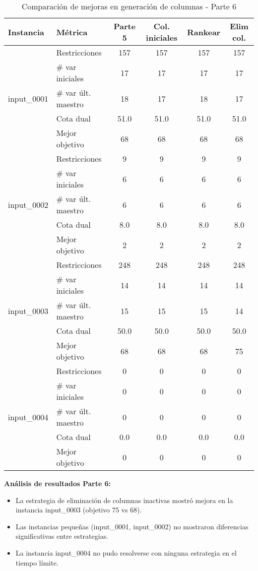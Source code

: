 \documentclass[a4paper,12pt]{article}
\begin{document}
\begin{table}[!ht]
\centering
\renewcommand{\arraystretch}{1.2}
\begin{tabular}{llcccc}
\toprule
\textbf{Instancia} & \textbf{Métrica} & \textbf{Parte 5} & \textbf{Col. iniciales} & \textbf{Rankear} & \textbf{Elim col.} \\
\midrule
\multirow{5}{*}{input\_0001} 
  & Restricciones         & 157 & 157 & 157 & 157 \\
  & \# var iniciales      & 17  & 17  & 17  & 17  \\
  & \# var últ. maestro   & 18  & 17  & 18  & 17  \\
  & Cota dual             & 51.0& 51.0& 51.0& 51.0 \\
  & Mejor objetivo        & 68  & 68  & 68  & 68  \\
\midrule
\multirow{5}{*}{input\_0002} 
  & Restricciones         & 9   & 9   & 9   & 9   \\
  & \# var iniciales      & 6   & 6   & 6   & 6   \\
  & \# var últ. maestro   & 6   & 6   & 6   & 6   \\
  & Cota dual             & 8.0 & 8.0 & 8.0 & 8.0 \\
  & Mejor objetivo        & 2   & 2   & 2   & 2   \\
\midrule
\multirow{5}{*}{input\_0003} 
  & Restricciones         & 248 & 248 & 248 & 248 \\
  & \# var iniciales      & 14  & 14  & 14  & 14  \\
  & \# var últ. maestro   & 15  & 15  & 15  & 14  \\
  & Cota dual             & 50.0& 50.0& 50.0& 50.0 \\
  & Mejor objetivo        & 68  & 68  & 68  & 75  \\
\midrule
\multirow{5}{*}{input\_0004} 
  & Restricciones         & 0   & 0   & 0   & 0   \\
  & \# var iniciales      & 0   & 0   & 0   & 0   \\
  & \# var últ. maestro   & 0   & 0   & 0   & 0   \\
  & Cota dual             & 0.0 & 0.0 & 0.0 & 0.0 \\
  & Mejor objetivo        & 0   & 0   & 0   & 0   \\
\bottomrule
\end{tabular}
\caption{Comparación de mejoras en generación de columnas - Parte 6}
\end{table}

\textbf{Análisis de resultados Parte 6:}
\begin{itemize}
    \item La estrategia de eliminación de columnas inactivas mostró mejora en la instancia input\_0003 (objetivo 75 vs 68).
    \item Las instancias pequeñas (input\_0001, input\_0002) no mostraron diferencias significativas entre estrategias.
    \item La instancia input\_0004 no pudo resolverse con ninguna estrategia en el tiempo límite.
\end{itemize}
\end{document}
